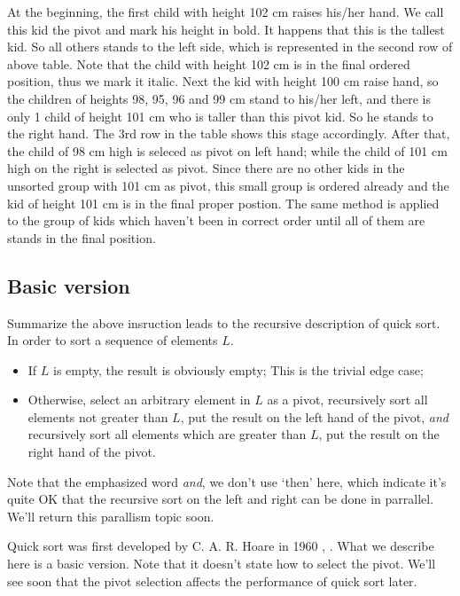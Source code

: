 \documentclass{article}
\begin{document}
At the beginning, the first child with height 102 cm raises his/her hand. We call this kid the pivot and mark
his height in bold.
It happens that this is the tallest kid.
So all others stands to the left side, which is represented in the second row of above table. Note that
the child with height 102 cm is in the final ordered position, thus we mark it italic. Next the kid with
height 100 cm raise hand, so the children of heights 98, 95, 96 and 99 cm stand to his/her left, and there
is only 1 child of height 101 cm who is taller than this pivot kid. So he stands to the right hand.
The 3rd row in the table shows this stage accordingly. After that, the child of 98 cm high is seleced
as pivot on left hand; while the child of 101 cm high on the right is selected as pivot. Since there
are no other kids in the unsorted group with 101 cm as pivot, this small group is ordered already and
the kid of height 101 cm is in the final proper postion. The same method is applied to the group of kids
which haven't been in correct order until all of them are stands in the final position.

\subsection{Basic version}
Summarize the above insruction leads to the recursive description of quick sort. In order to sort a sequence
of elements $L$.

\begin{itemize}
\item If $L$ is empty, the result is obviously empty; This is the trivial edge case;
\item Otherwise, select an arbitrary element in $L$ as a pivot, recursively sort all elements not greater than $L$, put
the result on the left hand of the pivot, {\em and} recursively sort all elements which are greater than $L$, put
the result on the right hand of the pivot.
\end{itemize}

Note that the emphasized word {\em and}, we don't use `then' here, which indicate it's quite OK that 
the recursive sort on the left and right can be done in parrallel. We'll return this parallism topic soon.

Quick sort was first developed by C. A. R. Hoare in 1960 \cite{TAOCP}, \cite{wiki-qs}. What we describe here
is a basic version. Note that it doesn't state how to select the pivot. We'll see soon that the pivot selection
affects the performance of quick sort later.
\end{document}
